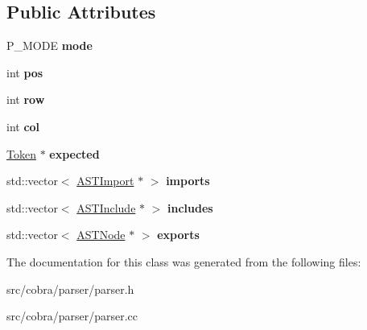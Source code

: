 \subsection*{Public Attributes}
\begin{DoxyCompactItemize}
\item 
\hypertarget{class_cobra_1_1internal_1_1_parser_a29c4066c4128e94b440cbcd953cf82a3}{P\+\_\+\+M\+O\+D\+E {\bfseries mode}}\label{class_cobra_1_1internal_1_1_parser_a29c4066c4128e94b440cbcd953cf82a3}

\item 
\hypertarget{class_cobra_1_1internal_1_1_parser_a98758ad312cc65395cf606ddcdf7b185}{int {\bfseries pos}}\label{class_cobra_1_1internal_1_1_parser_a98758ad312cc65395cf606ddcdf7b185}

\item 
\hypertarget{class_cobra_1_1internal_1_1_parser_a390383ae8d2b07faa20189fd59f5738b}{int {\bfseries row}}\label{class_cobra_1_1internal_1_1_parser_a390383ae8d2b07faa20189fd59f5738b}

\item 
\hypertarget{class_cobra_1_1internal_1_1_parser_a4a25ce49b0936d342cdd73df23056278}{int {\bfseries col}}\label{class_cobra_1_1internal_1_1_parser_a4a25ce49b0936d342cdd73df23056278}

\item 
\hypertarget{class_cobra_1_1internal_1_1_parser_a0a56a117059a9a64d4d5d5fef9abdf97}{\hyperlink{class_cobra_1_1internal_1_1_token}{Token} $\ast$ {\bfseries expected}}\label{class_cobra_1_1internal_1_1_parser_a0a56a117059a9a64d4d5d5fef9abdf97}

\item 
\hypertarget{class_cobra_1_1internal_1_1_parser_abbf6e632b65c68396187239efdc3d1b8}{std\+::vector$<$ \hyperlink{class_cobra_1_1internal_1_1_a_s_t_import}{A\+S\+T\+Import} $\ast$ $>$ {\bfseries imports}}\label{class_cobra_1_1internal_1_1_parser_abbf6e632b65c68396187239efdc3d1b8}

\item 
\hypertarget{class_cobra_1_1internal_1_1_parser_a29a37559d85035b4bf8e92b665878018}{std\+::vector$<$ \hyperlink{class_cobra_1_1internal_1_1_a_s_t_include}{A\+S\+T\+Include} $\ast$ $>$ {\bfseries includes}}\label{class_cobra_1_1internal_1_1_parser_a29a37559d85035b4bf8e92b665878018}

\item 
\hypertarget{class_cobra_1_1internal_1_1_parser_a73f868c361c5e24d1dc6d33a3457a3be}{std\+::vector$<$ \hyperlink{class_cobra_1_1internal_1_1_a_s_t_node}{A\+S\+T\+Node} $\ast$ $>$ {\bfseries exports}}\label{class_cobra_1_1internal_1_1_parser_a73f868c361c5e24d1dc6d33a3457a3be}

\end{DoxyCompactItemize}


The documentation for this class was generated from the following files\+:\begin{DoxyCompactItemize}
\item 
src/cobra/parser/parser.\+h\item 
src/cobra/parser/parser.\+cc\end{DoxyCompactItemize}
